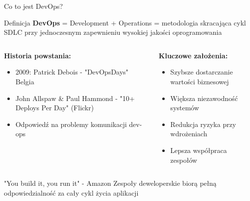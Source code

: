 \documentclass[10pt, aspectratio=169]{beamer}
\begin{document}
\begin{frame}{Co to jest DevOps?}
\begin{alertblock}{Definicja}
\textbf{DevOps} = Development + Operations = metodologia skracająca cykl SDLC przy jednoczesnym zapewnieniu wysokiej jakości oprogramowania
\end{alertblock}

\begin{columns}[T]
\begin{column}{0.5\textwidth}
\textbf{Historia powstania:}
\begin{itemize}
\item 2009: Patrick Debois - "DevOpsDays" Belgia
\item John Allspaw \& Paul Hammond - "10+ Deploys Per Day" (Flickr)
\item Odpowiedź na problemy komunikacji dev-ops
\end{itemize}
\end{column}
\begin{column}{0.5\textwidth}
\textbf{Kluczowe założenia:}
\begin{itemize}
\item Szybsze dostarczanie wartości biznesowej
\item Większa niezawodność systemów
\item Redukcja ryzyka przy wdrożeniach
\item Lepsza współpraca zespołów
\end{itemize}
\end{column}
\end{columns}

\begin{block}{"You build it, you run it" - Amazon}
Zespoły deweloperskie biorą pełną odpowiedzialność za cały cykl życia aplikacji
\end{block}
\end{frame}
\end{document}
